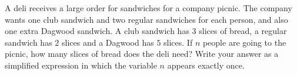 A deli receives a large order for sandwiches for a company picnic. The company wants one club sandwich and two regular sandwiches for each person, and also one extra Dagwood sandwich. A club sandwich has $3$ slices of bread, a regular sandwich has $2$ slices and a Dagwood has $5$ slices. If $n$ people are going to the picnic, how many slices of bread does the deli need? Write your answer as a simplified expression in which the variable $n$ appears exactly once.
